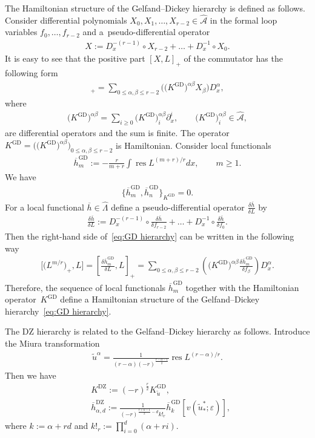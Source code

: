 \documentclass[pdftex]{sigma}
\numberwithin{equation}{section}
\newcommand{\tu}{{\widetilde u}}
\newcommand{\oh}{\overline h}
\newcommand{\hLambda}{\widehat\Lambda}
\def\d{{\partial}}
\newcommand{\<}{\left<}
\renewcommand{\>}{\right>}
\newcommand{\eps}{\varepsilon}
\newcommand{\hcA}{\widehat{\mathcal A}}
\newcommand{\DZ}{\mathrm{DZ}}
\newcommand{\res}{\mathop{\mathrm{res}}\nolimits}
\newcommand{\GD}{\mathrm{GD}}
\begin{document}
The Hamiltonian structure of the Gelfand--Dickey hierarchy is def\/ined as follows. Consider dif\/ferential polynomials $X_0,X_1,\dots,X_{r-2}\in\hcA$ in the formal loop variables $f_0,\dots,f_{r-2}$ and a~pseudo-dif\/ferential operator
\begin{gather*}
X:=D_x^{-(r-1)}\circ X_{r-2}+\dots+D_x^{-1}\circ X_0.
\end{gather*}
It is easy to see that the positive part $[X,L]_+$ of the commutator has the following form
\begin{gather*}
[X,L]_+=\sum_{0\le\alpha,\beta\le r-2}\big(\big(K^\GD\big)^{\alpha\beta}X_\beta\big)D_x^\alpha,
\end{gather*}
where
\begin{gather*}
\big(K^{\GD}\big)^{\alpha\beta}=\sum_{i\ge 0}\big(K^{\GD}\big)^{\alpha\beta}_i\d_x^i,\qquad \big(K^{\GD}\big)^{\alpha\beta}_i\in\hcA,
\end{gather*}
are dif\/ferential operators and the sum is f\/inite. The operator $K^{\GD}=\big(\big(K^{\GD}\big)^{\alpha\beta}\big)_{0\le\alpha,\beta\le r-2}$ is Hamiltonian. Consider local functionals
\begin{gather*}
\oh_m^{\GD}:=-\frac{r}{m+r}\int \res L^{(m+r)/r}dx,\qquad m\ge 1.
\end{gather*}
We have
\begin{gather*}
\big\{\oh^{\GD}_m,\oh^{\GD}_n\big\}_{K^{\GD}}=0.
\end{gather*}
For a local functional $\oh\in\hLambda$ def\/ine a pseudo-dif\/ferential operator $\frac{\delta\oh}{\delta L}$ by
\begin{gather*}
\frac{\delta\oh}{\delta L}:=D_x^{-(r-1)}\circ\frac{\delta\oh}{\delta f_{r-2}}+\dots+D_x^{-1}\circ\frac{\delta\oh}{\delta f_0}.
\end{gather*}
Then the right-hand side of~\eqref{eq:GD hierarchy} can be written in the following way
\begin{gather*}
\big[\big(L^{m/r}\big)_+,L\big]=\left[\frac{\delta\oh^{\GD}_m}{\delta L},L\right]_+=\sum_{0\le\alpha,\beta\le r-2}\left(\big(K^\GD\big)^{\alpha\beta}\frac{\delta\oh^{\GD}_m}{\delta f_\beta}\right)D_x^\alpha.
\end{gather*}
Therefore, the sequence of local functionals $\oh^{\GD}_m$ together with the Hamiltonian operator~$K^{\GD}$ def\/ine a Hamiltonian structure of the Gelfand--Dickey hierarchy~\eqref{eq:GD hierarchy}.

The DZ hierarchy is related to the Gelfand--Dickey hierarchy as follows. Introduce the Miura transformation
\begin{gather*}
\tu^\alpha=\frac{1}{(r-\alpha)(-r)^{\frac{r-\alpha-1}{2}}}\res L^{(r-\alpha)/r}.
\end{gather*}
Then we have
\begin{align*}
&K^\DZ:=(-r)^{\frac{r}{2}}K^{\GD}_\tu,\\
&\oh_{\alpha,d}^\DZ:=\frac{1}{(-r)^{\frac{r+k-1}{2}-d}k!_r}\oh_k^{\GD}[v(\tu^*_*;\eps)],
\end{align*}
where $k:=\alpha+rd$ and $k!_r:=\prod\limits_{i=0}^d(\alpha+ri)$.
\end{document}
